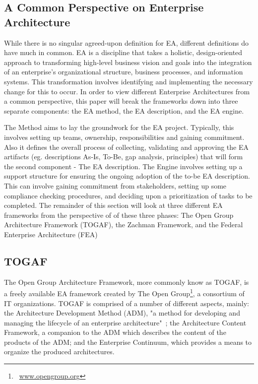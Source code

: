 \subsection{A Common Perspective on Enterprise Architecture}
While there is no singular agreed-upon definition for EA, different definitions\cite{jungle2004,GartnerInc,ross2006,pearlson2009,lankhorst2009,sessions2007,togaf9.1} do have much in common. EA is a discipline that takes a holistic, design-oriented approach to transforming high-level business vision and goals into the integration of an enterprise's organizational structure, business processes, and information systems. This transformation involves identifying and implementing the necessary change for this to occur. In order to view different Enterprise Architectures from a common perspective, this paper will break the frameworks down into three separate components: the EA method, the EA description, and the EA engine. 

The Method aims to lay the groundwork for the EA project. Typically, this involves setting up teams, ownership, responsibilities and gaining commitment. Also it defines the overall process of collecting, validating and approving the EA artifacts  (eg. descriptions As-Is, To-Be, gap analysis,  principles) that will form the second component - The EA description.  The Engine involves setting up a support structure for ensuring the ongoing adoption of the to-be EA description. This can involve gaining commitment from stakeholders, setting up some compliance checking procedures, and deciding upon a prioritization of tasks to be completed. The remainder of this section will look at three different EA frameworks from the perspective of of these three phases: The Open Group Architecture Framework (TOGAF), the Zachman Framework, and the Federal Enterprise Architecture (FEA)

\subsection{TOGAF}
The Open Group Architecture Framework, more commonly know as TOGAF, is a freely available EA framework created by The Open Group\footnote{~\url{www.opengroup.org}}, a consortium of IT organizations. TOGAF is comprised of a number of different aspects, mainly: the Architecture Development Method (ADM), "a method for developing and managing the lifecycle of an enterprise architecture"~\cite[Ch. 5.1]{togaf9.1}; the Architecture Content Framework, a companion to the ADM which describes the content of the products of the ADM; and the Enterprise Continuum, which provides a means to organize the produced architectures. 
